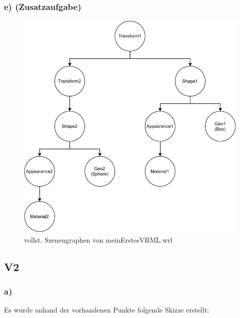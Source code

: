 \documentclass{article}
\begin{document}
\subsubsection*{e) (Zusatzaufgabe)}
\begin{figure}[!ht]
    \centering
    \includegraphics[scale=0.5]{V1_fullSceneGraph.pdf}
    \caption{vollst. Szenengraphen von meinErstesVRML.wrl}
\end{figure}

\subsection*{V2}
\subsubsection*{a)}
Es wurde anhand der vorhandenen Punkte folgende Skizze erstellt:
\end{document}
